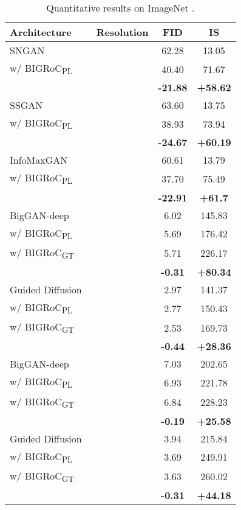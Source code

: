 \documentclass[10pt]{article} \usepackage[accepted]{tmlr}
\begin{document}
\begin{table}[ht]
\caption{\label{tab:results_IN}Quantitative results on ImageNet .}
\centering
\begin{tabular}{lc|cc}
\toprule
Architecture & Resolution & FID  & IS  \\
\midrule
\rowcolor{LightGray}SNGAN~\citep{miyato2018spectral} &  & 62.28 & 13.05 \\ 
w/ BIGRoC\textsubscript{PL} && 40.40 & 71.67 \\ 
 & & \color{mygreen}\textbf{-21.88} & \color{mygreen}\textbf{+58.62} \\
\hline
\rowcolor{LightGray}SSGAN~\citep{chen2019selfsupervised} &  & 63.60 & 13.75 \\ 
w/ BIGRoC\textsubscript{PL} && 38.93 & 73.94 \\
 & & \color{mygreen}\textbf{-24.67} & \color{mygreen}\textbf{+60.19} \\
\hline
\rowcolor{LightGray}InfoMaxGAN~\citep{Lee_2021_WACV} &  & 60.61 & 13.79 \\ 
w/ BIGRoC\textsubscript{PL} && 37.70 & 75.49 \\
 & & \color{mygreen}\textbf{-22.91} & \color{mygreen}\textbf{+61.7} \\
\hline
\rowcolor{LightGray}BigGAN-deep~\citep{brock2019large} &  & 6.02 & 145.83 \\ 
w/ BIGRoC\textsubscript{PL} && 5.69 & 176.42 \\
w/ BIGRoC\textsubscript{GT} && 5.71 & 226.17 \\
 & & \color{mygreen}\textbf{-0.31} & \color{mygreen}\textbf{+80.34} \\
\hline
\rowcolor{LightGray}Guided Diffusion~\citep{dhariwal2021diffusion} &  & 2.97 & 141.37 \\
w/ BIGRoC\textsubscript{PL} && 2.77 & 150.43 \\
w/ BIGRoC\textsubscript{GT} && 2.53 & 169.73 \\
 & & \color{mygreen}\textbf{-0.44} & \color{mygreen}\textbf{+28.36} \\
\hline
\rowcolor{LightGray}BigGAN-deep~\citep{brock2019large} &  & 7.03 & 202.65 \\ 
w/ BIGRoC\textsubscript{PL} && 6.93 & 221.78 \\
w/ BIGRoC\textsubscript{GT} && 6.84 & 228.23 \\
 & & \color{mygreen}\textbf{-0.19} & \color{mygreen}\textbf{+25.58} \\
\hline
\rowcolor{LightGray}Guided Diffusion~\citep{dhariwal2021diffusion} &  & 3.94 & 215.84 \\
w/ BIGRoC\textsubscript{PL} && 3.69 & 249.91 \\
w/ BIGRoC\textsubscript{GT} && 3.63 & 260.02 \\
 & & \color{mygreen}\textbf{-0.31} & \color{mygreen}\textbf{+44.18} \\
\bottomrule
\end{tabular}
\end{table}
\end{document}
